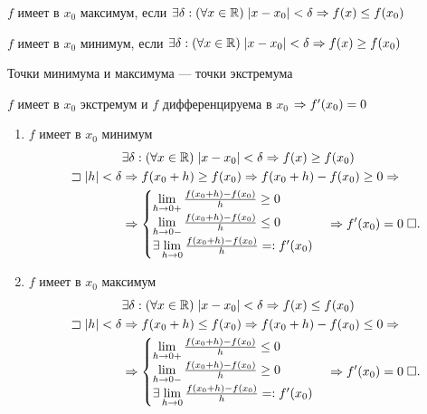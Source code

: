 \documentclass{article}
\begin{document}


$f$ имеет в $x_0$ максимум, если $\exists\delta:(\forall x\in\mathbb{R})\;|x-x_0|<\delta\Rightarrow f(x)\leq f(x_0)$

$f$ имеет в $x_0$ минимум, если $\exists\delta:(\forall x\in\mathbb{R})\;|x-x_0|<\delta\Rightarrow f(x)\geq f(x_0)$

Точки минимума и максимума --- точки экстремума

\theorem

$f$ имеет в $x_0$ экстремум и $f$ дифференцируема в $x_0$ $\Rightarrow f'(x_0)=0$

\proof
\begin{enumerate}
	\item$f$ имеет в $x_0$ минимум
	\begin{align*}
		 & \exists\delta: (\forall x\in\mathbb{R})\;|x-x_0|<\delta\Rightarrow f(x)\geq f(x_0) \\
		\sqsupset |h| < \delta
		 & \Rightarrow f(x_0+h)\geq f(x_0) \Rightarrow f(x_0+h)-f(x_0) \geq 0\Rightarrow          \\
		 & \Rightarrow\begin{cases}
			        \lim\limits_{h\to0+}\frac{f(x_0+h)-f(x_0)}{h}\geq0 \\
			        \lim\limits_{h\to0-}\frac{f(x_0+h)-f(x_0)}{h}\leq0 \\
			        \exists\lim\limits_{h\to0}\frac{f(x_0+h)-f(x_0)}{h}=:f'(x_0)
		        \end{cases} \Rightarrow f'(x_0)=0\;\square.
	\end{align*}
	\item$f$ имеет в $x_0$ максимум
	\begin{align*}
		 & \exists\delta: (\forall x\in\mathbb{R})\;|x-x_0|<\delta\Rightarrow f(x)\leq f(x_0) \\
		\sqsupset |h| < \delta
		 & \Rightarrow f(x_0+h)\leq f(x_0) \Rightarrow f(x_0+h)-f(x_0) \leq 0\Rightarrow          \\
		 & \Rightarrow\begin{cases}
			        \lim\limits_{h\to0+}\frac{f(x_0+h)-f(x_0)}{h}\leq0 \\
			        \lim\limits_{h\to0-}\frac{f(x_0+h)-f(x_0)}{h}\geq0 \\
			        \exists\lim\limits_{h\to0}\frac{f(x_0+h)-f(x_0)}{h}=:f'(x_0)
		        \end{cases} \Rightarrow f'(x_0)=0\;\square.
	\end{align*}
\end{enumerate}
\end{document}
